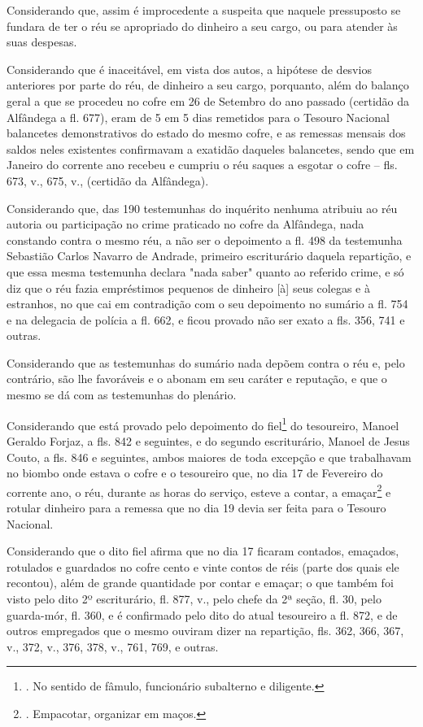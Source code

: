Considerando que, assim é improcedente a suspeita que naquele
pressuposto se fundara de ter o réu se apropriado do dinheiro a seu
cargo, ou para atender às suas despesas.

Considerando que é inaceitável, em vista dos autos, a hipótese de
desvios anteriores por parte do réu, de dinheiro a seu cargo, porquanto,
além do balanço geral a que se procedeu no cofre em 26 de Setembro do
ano passado (certidão da Alfândega a fl. 677), eram de 5 em 5 dias
remetidos para o Tesouro Nacional balancetes demonstrativos do estado do
mesmo cofre, e as remessas mensais dos saldos neles existentes
confirmavam a exatidão daqueles balancetes, sendo que em Janeiro do
corrente ano recebeu e cumpriu o réu saques a esgotar o cofre -- fls.
673, v., 675, v., (certidão da Alfândega).

Considerando que, das 190 testemunhas do inquérito nenhuma atribuiu ao
réu autoria ou participação no crime praticado no cofre da Alfândega,
nada constando contra o mesmo réu, a não ser o depoimento a fl. 498 da
testemunha Sebastião Carlos Navarro de Andrade, primeiro escriturário
daquela repartição, e que essa mesma testemunha declara "nada saber"
quanto ao referido crime, e só diz que o réu fazia empréstimos pequenos
de dinheiro {[}à{]} seus colegas e à estranhos, no que cai em
contradição com o seu depoimento no sumário a fl. 754 e na delegacia de
polícia a fl. 662, e ficou provado não ser exato a fls. 356, 741 e
outras.

Considerando que as testemunhas do sumário nada depõem contra o réu e,
pelo contrário, são lhe favoráveis e o abonam em seu caráter e
reputação, e que o mesmo se dá com as testemunhas do plenário.

Considerando que está provado pelo depoimento do fiel\footnote{. No
  sentido de fâmulo, funcionário subalterno e diligente.} do tesoureiro,
Manoel Geraldo Forjaz, a fls. 842 e seguintes, e do segundo
escriturário, Manoel de Jesus Couto, a fls. 846 e seguintes, ambos
maiores de toda excepção e que trabalhavam no biombo onde estava o cofre
e o tesoureiro que, no dia 17 de Fevereiro do corrente ano, o réu,
durante as horas do serviço, esteve a contar, a emaçar\footnote{.
  Empacotar, organizar em maços.} e rotular dinheiro para a remessa que
no dia 19 devia ser feita para o Tesouro Nacional.

Considerando que o dito fiel afirma que no dia 17 ficaram contados,
emaçados, rotulados e guardados no cofre cento e vinte contos de réis
(parte dos quais ele recontou), além de grande quantidade por contar e
emaçar; o que também foi visto pelo dito 2º escriturário, fl. 877, v.,
pelo chefe da 2ª seção, fl. 30, pelo guarda-mór, fl. 360, e é confirmado
pelo dito do atual tesoureiro a fl. 872, e de outros empregados que o
mesmo ouviram dizer na repartição, fls. 362, 366, 367, v., 372, v., 376,
378, v., 761, 769, e outras.

